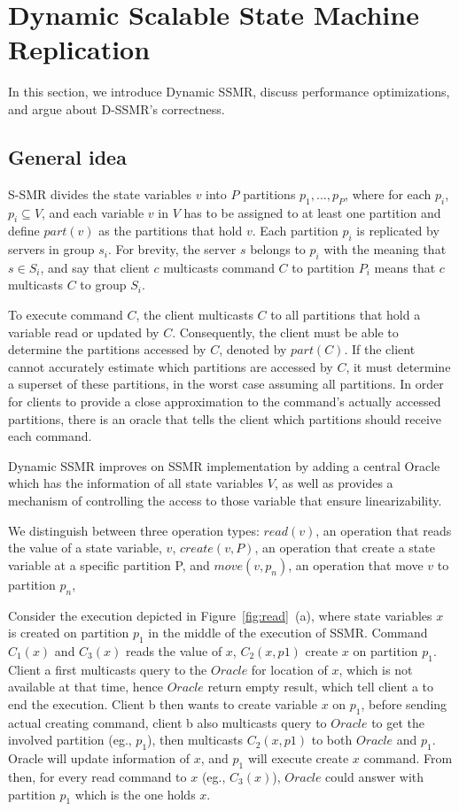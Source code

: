 \section{Dynamic Scalable State Machine Replication}

In this section, we introduce Dynamic SSMR, discuss performance optimizations, and argue about D-SSMR's correctness.

\subsection{General idea}
\label{sec:generalidea}

S-SMR divides the state variables $v$ into $P$ partitions $p_1, ..., p_P$, where for each $p_i$, $p_i \subseteq V$, and each variable $v$ in $V$ has to be assigned to at least one partition and define $part(v)$ as the partitions that hold $v$. Each partition $p_i$ is replicated by servers in group $s_i$. For brevity, the server $s$ belongs to $p_i$ with the meaning that $s \in S_i$, and say that client $c$ multicasts command $C$ to partition $P_i$ means that $c$ multicasts $C$ to group $S_i$.

To execute command $C$, the client multicasts $C$ to all partitions that hold a variable read or updated by $C$.
Consequently, the client must be able to determine the partitions accessed by $C$, denoted by $part(C)$. If the client cannot accurately estimate which partitions are accessed by $C$, it must determine a superset of these partitions, in the worst case assuming all partitions.
In order for clients to provide a close approximation to the command's actually accessed partitions, there is an oracle that tells the client which partitions should receive each command.

Dynamic SSMR improves on SSMR implementation by adding a central Oracle which has the information of all state variables $V$, as well as provides a mechanism of controlling the access to those variable that ensure linearizability. 

We distinguish between three operation types: $read(v)$, an operation that reads the value of a state variable, $v$, $create(v, P)$, an operation that create a state variable at a specific partition P, and $move(v, p_n)$, an operation that move $v$ to partition $p_n$,

Consider the execution depicted in Figure~\ref{fig:read}~(a), where state variables $x$ is created on partition $p_1$ in the middle of the execution of SSMR. Command $C_1(x)$ and $C_3(x)$ reads the value of $x$, $C_2(x,p1)$ create $x$ on partition $p_1$. Client a first multicasts query to the $Oracle$ for location of $x$, which is not available at that time, hence $Oracle$ return empty result, which tell client a to end the execution. Client b then wants to create variable $x$ on $p_1$, before sending actual creating command, client b also multicasts query to $Oracle$ to get the involved partition (eg., $p_1$), then multicasts $C_2(x,p1)$ to both $Oracle$ and $p_1$. Oracle will update information of $x$, and $p_1$ will execute create $x$ command. From then, for every read command to $x$ (eg., $C_3(x)$), $Oracle$ could answer with partition $p_1$ which is the one holds $x$.

